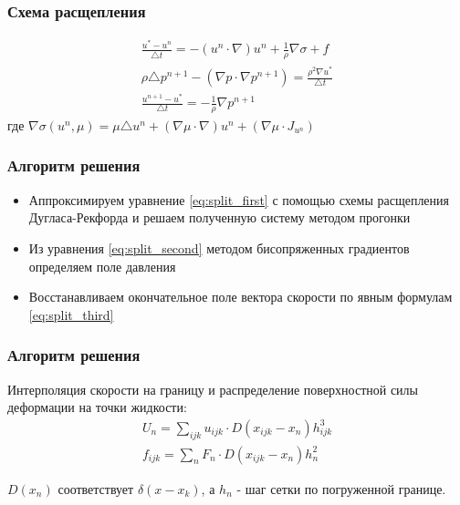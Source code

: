 \documentclass[14pt]{beamer}
\begin{document}
\begin{frame}
\frametitle{Схема расщепления}
\begin{gather}
    \label{eq:split_first}
    \frac{u^* - u^n}{\triangle t} = - (u^n \cdot \nabla) u^n + \frac{1}{\rho} \nabla \sigma + f\\
    \label{eq:split_second}
    \rho \triangle p^{n+1} - (\nabla p \cdot \nabla p^{n+1}) = \frac{\rho^2 \nabla u^*}{\triangle t}\\
    \label{eq:split_third}
    \frac{u^{n+1} - u^*}{\triangle t} = - \frac{1}{\rho} \nabla p^{n+1}
\end{gather}
где $\nabla \sigma (u^n, \mu) = \mu \triangle u^n + (\nabla \mu \cdot \nabla) u^n + (\nabla \mu \cdot J_{u^n}) $
\end{frame}

\begin{frame}
\frametitle{Алгоритм решения}
    \begin{itemize}
        \item \alert<+>{Аппроксимируем уравнение \eqref{eq:split_first} с помощью схемы расщепления Дугласа-Рекфорда и решаем полученную систему методом прогонки}
        \item \alert<+>{Из уравнения \eqref{eq:split_second} методом бисопряженных градиентов определяем поле давления}
        \item \alert<+>{Восстанавливаем окончательное поле вектора скорости по явным формулам \eqref{eq:split_third}}
    \end{itemize}
\end{frame}

\begin{frame}
\frametitle{Алгоритм решения}
Интерполяция скорости на границу и распределение поверхностной силы деформации на точки жидкости:
\begin{gather}
    \label{eq:interpolation}
    U_n = \sum_{ijk}u_{ijk} \cdot D(x_{ijk} - x_n) h_{ijk}^3 \\
    \label{eq:spreading}
    f_{ijk} = \sum_n F_n \cdot D(x_{ijk} - x_n) h^2_n
\end{gather}

$D(x_n)$ соответствует $\delta(x - x_k)$, а $h_n$ - шаг сетки по погруженной границе.
\end{frame}
\end{document}
